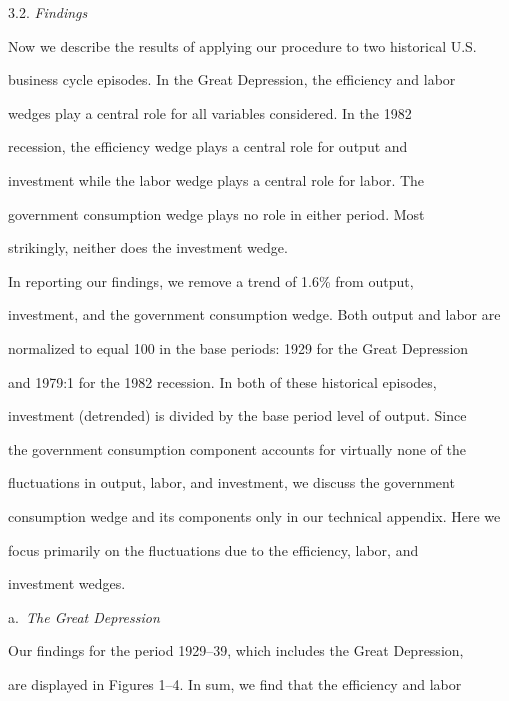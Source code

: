 \documentclass[fleqn,leqno,11pt]{article}
\begin{document}
\begin{center}

3.2. \emph{Findings}

\end{center}



Now we describe the results of applying our procedure to two historical U.S.

business cycle episodes. In the Great Depression, the efficiency and labor

wedges play a central role for all variables considered. In the 1982

recession, the efficiency wedge plays a central role for output and

investment while the labor wedge plays a central role for labor. The

government consumption wedge plays no role in either period. Most

strikingly, neither does the investment wedge.



In reporting our findings, we remove a trend of 1.6\% from output,

investment, and the government consumption wedge. Both output and labor are

normalized to equal 100 in the base periods: 1929 for the Great Depression

and 1979:1 for the 1982 recession. In both of these historical episodes,

investment (detrended) is divided by the base period level of output. Since

the government consumption component accounts for virtually none of the

fluctuations in output, labor, and investment, we discuss the government

consumption wedge and its components only in our technical appendix. Here we

focus primarily on the fluctuations due to the efficiency, labor, and

investment wedges.



\bigskip



\noindent a.\emph{\ }\textit{The Great Depression}



Our findings for the period 1929--39, which includes the Great Depression,

are displayed in Figures 1--4. In sum, we find that the efficiency and labor
\end{document}

